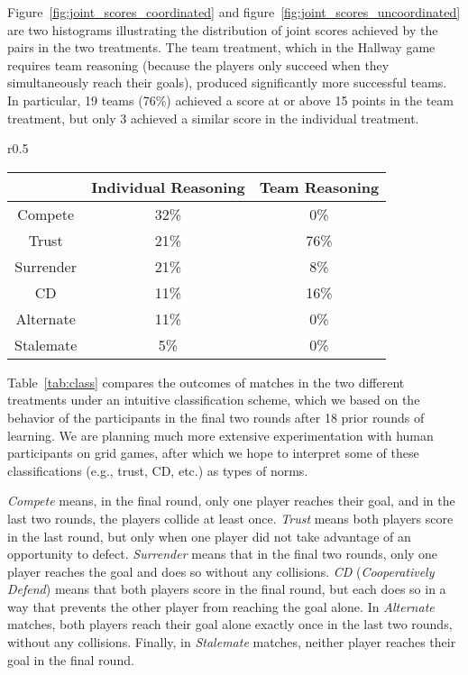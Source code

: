 
Figure~\ref{fig:joint_scores_coordinated} and 
figure~\ref{fig:joint_scores_uncoordinated} are two histograms illustrating the
distribution of joint scores achieved by the pairs in the two
treatments.  The team treatment, which in the Hallway game requires
team reasoning (because the players only succeed when they
simultaneously reach their goals), produced significantly more
successful teams.
%
In particular, 19 teams (76\%) achieved a score at or above 15 points
in the team treatment, but only 3 achieved a similar score in the
individual treatment.

\begin{wraptable}{r}{0.5\textwidth}
\begin{center}
\small{
\begin{tabular}{|c|c|c|}									   
\hline
			& Individual Reasoning              & Team Reasoning 	\\ \hline
 Compete		& 32\% 					& 0\% 			\\ \hline
 Trust		& 21\% 					& 76\% 			\\ \hline
 Surrender	& 21\% 					& 8\% 			\\ \hline
 CD			& 11\% 					& 16\% 			\\ \hline
 Alternate		& 11\% 					& 0\% 			\\ \hline
 Stalemate	& 5\% 					& 0\% 			\\ \hline
\end{tabular}}
\caption{A comparison between the strategies learned by pairs in the two treatments. 
These percentages represent $19$ games in the individual reasoning experiment,
and $25$ games in the team reasoning experiment.}
\label{tab:class}
\end{center}
\end{wraptable}

Table~\ref{tab:class} compares the outcomes of matches in the two
different treatments under an intuitive classification scheme, which
we based on the behavior of the participants in the final two rounds
after 18 prior rounds of learning.  We are planning much more
extensive experimentation with human participants on grid games, after
which we hope to interpret some of these classifications
(e.g., trust, CD, etc.) as types of norms.

\emph{Compete\/} means, in the final round, only one player reaches
their goal, and in the last two rounds, the players collide at least
once.  \emph{Trust\/} means both players score in the last round, but
only when one player did not take advantage of an opportunity to
defect.  \emph{Surrender\/} means that in the final two rounds, only
one player reaches the goal and does so without any collisions.
\emph{CD} (\emph{Cooperatively Defend}) means that both players score
in the final round, but each does so in a way that prevents the other
player from reaching the goal alone.  In \emph{Alternate} matches,
both players reach their goal alone exactly once in the last two
rounds, without any collisions.  Finally, in \emph{Stalemate} matches,
neither player reaches their goal in the final round.

